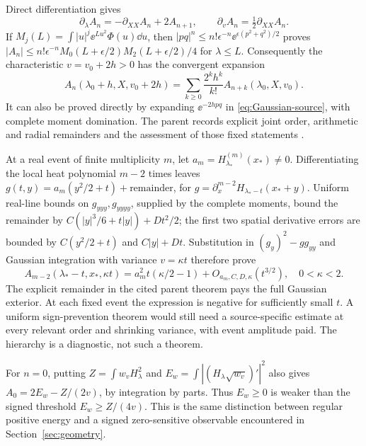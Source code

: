 Direct differentiation gives
\begin{equation}\label{eq:Gaussian-hierarchy}
 \partial_\lambda A_n=-\partial_{XX}A_n+2A_{n+1},\qquad
 \partial_v A_n=\tfrac12\partial_{XX}A_n.
\end{equation}
If \(M_j(L)=\int|u|^j\ee^{Lu^2}\Phi(u)\dd u\), then
\(|pq|^n\le n!\epsilon^{-n}\ee^{\epsilon(p^2+q^2)/2}\) proves
\( |A_n|\le n!\epsilon^{-n}M_0(L+\epsilon/2)M_2(L+\epsilon/2)/4\)
for \(\lambda\le L\). Consequently the characteristic
\(v=v_0+2h>0\) has the convergent expansion
\[
 A_n(\lambda_0+h,X,v_0+2h)
 =\sum_{k\ge0}\frac{2^kh^k}{k!}A_{n+k}(\lambda_0,X,v_0).
\]
It can also be proved directly by expanding \(\ee^{-2hpq}\) in
\eqref{eq:Gaussian-source}, with complete moment domination. The parent
records explicit joint order, arithmetic and radial remainders and the
assessment of those fixed statements \cite{GaussianLaguerreProof,LocalizedMetricsAssessment}.

At a real event of finite multiplicity \(m\), let
\(a_m=H_{\lambda_*}^{(m)}(x_*)\ne0\). Differentiating the local heat
polynomial \(m-2\) times leaves
\(g(t,y)=a_m(y^2/2+t)+\text{remainder}\), for
\(g=\partial_x^{m-2}H_{\lambda_*-t}(x_*+y)\).
Uniform real-line bounds on \(g_{yyy},g_{yyyy}\), supplied by the
complete moments, bound the remainder by
\(C(|y|^3/6+t|y|)+Dt^2/2\); the first two spatial derivative errors
are bounded by \(C(y^2/2+t)\) and \(C|y|+Dt\).
Substitution in \((g_y)^2-gg_{yy}\) and Gaussian integration with
variance \(v=\kappa t\) therefore prove
\begin{equation}\label{eq:Gaussian-event}
 A_{m-2}(\lambda_*-t,x_*,\kappa t)
 =a_m^2t(\kappa/2-1)+O_{a_m,C,D,\kappa}(t^{3/2}),\quad0<\kappa<2.
\end{equation}
The explicit remainder in the cited parent theorem pays the full
Gaussian exterior. At each fixed event the expression is negative
for sufficiently small \(t\). A uniform sign-prevention theorem would
still need a source-specific estimate at every relevant order and
shrinking variance, with event amplitude paid. The hierarchy is a
diagnostic, not such a theorem.

For \(n=0\), putting \(Z=\int w_vH_\lambda^2\) and
\(E_w=\int|(H_\lambda\sqrt{w_v})'|^2\) also gives
\(A_0=2E_w-Z/(2v)\), by integration by parts. Thus \(E_w\ge0\)
is weaker than the signed threshold \(E_w\ge Z/(4v)\). This is the
same distinction between regular positive energy and a signed
zero-sensitive observable encountered in Section~\ref{sec:geometry}.

